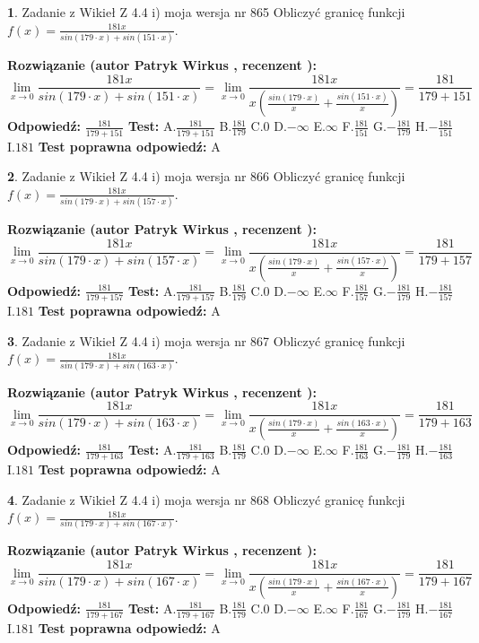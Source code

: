 \documentclass[12pt, a4paper]{article}
\theoremstyle{definition} %
\newtheorem{zad}{}
\newcommand{\zadStart}[1]{\begin{zad}#1\newline}
\newcommand{\zadStop}{\end{zad}}
\newcommand{\rozwStart}[2]{\noindent \textbf{Rozwiązanie (autor #1 , recenzent #2): }\newline}
\newcommand{\rozwStop}{\newline}
\newcommand{\odpStart}{\noindent \textbf{Odpowiedź:}\newline}
\newcommand{\odpStop}{\newline}
\newcommand{\testStart}{\noindent \textbf{Test:}\newline}
\newcommand{\testStop}{\newline}
\newcommand{\kluczStart}{\noindent \textbf{Test poprawna odpowiedź:}\newline}
\newcommand{\kluczStop}{\newline}
\begin{document}
\zadStart{Zadanie z Wikieł Z 4.4 i) moja wersja nr 865}
Obliczyć granicę funkcji $f(x)=\frac{181x}{sin(179\cdot x) +sin(151\cdot x)}$.
\zadStop
\rozwStart{Patryk Wirkus}{}
$$\lim\limits_{x\to 0}\frac{181x}{sin(179\cdot x) +sin(151\cdot x)}=\lim\limits_{x\to 0}\frac{181x}{x(\frac{sin(179\cdot x)}{x}+\frac{sin(151\cdot x)}{x})}=\frac{181}{179+151}$$
\rozwStop
\odpStart
$\frac{181}{179+151}$
\odpStop
\testStart
A.$\frac{181}{179+151}$
B.$\frac{181}{179}$
C.$0$
D.$-\infty$
E.$\infty$
F.$\frac{181}{151}$
G.$-\frac{181}{179}$
H.$-\frac{181}{151}$
I.$181$
\testStop
\kluczStart
A
\kluczStop



\zadStart{Zadanie z Wikieł Z 4.4 i) moja wersja nr 866}
Obliczyć granicę funkcji $f(x)=\frac{181x}{sin(179\cdot x) +sin(157\cdot x)}$.
\zadStop
\rozwStart{Patryk Wirkus}{}
$$\lim\limits_{x\to 0}\frac{181x}{sin(179\cdot x) +sin(157\cdot x)}=\lim\limits_{x\to 0}\frac{181x}{x(\frac{sin(179\cdot x)}{x}+\frac{sin(157\cdot x)}{x})}=\frac{181}{179+157}$$
\rozwStop
\odpStart
$\frac{181}{179+157}$
\odpStop
\testStart
A.$\frac{181}{179+157}$
B.$\frac{181}{179}$
C.$0$
D.$-\infty$
E.$\infty$
F.$\frac{181}{157}$
G.$-\frac{181}{179}$
H.$-\frac{181}{157}$
I.$181$
\testStop
\kluczStart
A
\kluczStop



\zadStart{Zadanie z Wikieł Z 4.4 i) moja wersja nr 867}
Obliczyć granicę funkcji $f(x)=\frac{181x}{sin(179\cdot x) +sin(163\cdot x)}$.
\zadStop
\rozwStart{Patryk Wirkus}{}
$$\lim\limits_{x\to 0}\frac{181x}{sin(179\cdot x) +sin(163\cdot x)}=\lim\limits_{x\to 0}\frac{181x}{x(\frac{sin(179\cdot x)}{x}+\frac{sin(163\cdot x)}{x})}=\frac{181}{179+163}$$
\rozwStop
\odpStart
$\frac{181}{179+163}$
\odpStop
\testStart
A.$\frac{181}{179+163}$
B.$\frac{181}{179}$
C.$0$
D.$-\infty$
E.$\infty$
F.$\frac{181}{163}$
G.$-\frac{181}{179}$
H.$-\frac{181}{163}$
I.$181$
\testStop
\kluczStart
A
\kluczStop



\zadStart{Zadanie z Wikieł Z 4.4 i) moja wersja nr 868}
Obliczyć granicę funkcji $f(x)=\frac{181x}{sin(179\cdot x) +sin(167\cdot x)}$.
\zadStop
\rozwStart{Patryk Wirkus}{}
$$\lim\limits_{x\to 0}\frac{181x}{sin(179\cdot x) +sin(167\cdot x)}=\lim\limits_{x\to 0}\frac{181x}{x(\frac{sin(179\cdot x)}{x}+\frac{sin(167\cdot x)}{x})}=\frac{181}{179+167}$$
\rozwStop
\odpStart
$\frac{181}{179+167}$
\odpStop
\testStart
A.$\frac{181}{179+167}$
B.$\frac{181}{179}$
C.$0$
D.$-\infty$
E.$\infty$
F.$\frac{181}{167}$
G.$-\frac{181}{179}$
H.$-\frac{181}{167}$
I.$181$
\testStop
\kluczStart
A
\kluczStop
\end{document}
